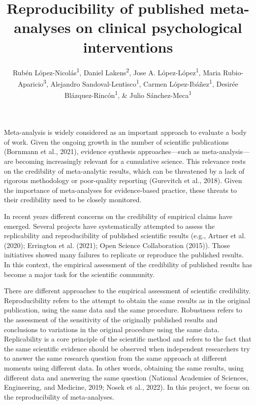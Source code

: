 \documentclass[
  ,man,floatsintext]{apa6}
\title{Reproducibility of published meta-analyses on clinical psychological interventions}
\author{Rubén López-Nicolás\textsuperscript{1}, Daniel Lakens\textsuperscript{2}, Jose A. López-López\textsuperscript{1}, Maria Rubio-Aparicio\textsuperscript{3}, Alejandro Sandoval-Lentisco\textsuperscript{1}, Carmen López-Ibáñez\textsuperscript{1}, Desirée Blázquez-Rincón\textsuperscript{1}, \& Julio Sánchez-Meca\textsuperscript{1}}
\date{}
\affiliation{\vspace{0.5cm}\textsuperscript{1} University of Murcia, Spain\\\textsuperscript{2} Eindhoven University of Technology, The Netherlands\\\textsuperscript{3} University of Alicante, Spain}
\begin{document}
\maketitle

Meta-analysis is widely considered as an important approach to evaluate a body of work. Given the ongoing growth in the number of scientific publications (Bornmann et al., 2021), evidence synthesis approaches---such as meta-analysis---are becoming increasingly relevant for a cumulative science. This relevance rests on the credibility of meta-analytic results, which can be threatened by a lack of rigorous methodology or poor-quality reporting (Gurevitch et al., 2018). Given the importance of meta-analyses for evidence-based practice, these threats to their credibility need to be closely monitored.

In recent years different concerns on the credibility of empirical claims have emerged. Several projects have systematically attempted to assess the replicability and reproducibility of published scientific results (e.g., Artner et al. (2020); Errington et al. (2021); Open Science Collaboration (2015)). Those initiatives showed many failures to replicate or reproduce the published results. In this context, the empirical assessment of the credibility of published results has become a major task for the scientific community.

There are different approaches to the empirical assessment of scientific credibility. Reproducibility refers to the attempt to obtain the same results as in the original publication, using the same data and the same procedure. Robustness refers to the assessment of the sensitivity of the originally published results and conclusions to variations in the original procedure using the same data. Replicability is a core principle of the scientific method and refers to the fact that the same scientific evidence should be observed when independent researchers try to answer the same research question from the same approach at different moments using different data. In other words, obtaining the same results, using different data and answering the same question (National Academies of Sciences, Engineering, and Medicine, 2019; Nosek et al., 2022). In this project, we focus on the reproducibility of meta-analyses.
\end{document}
